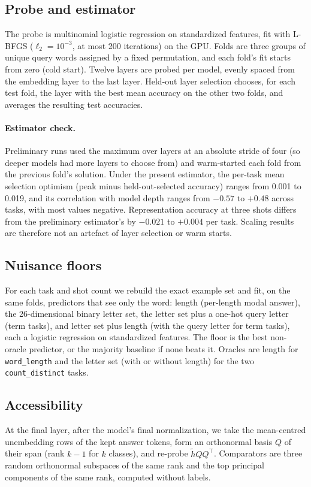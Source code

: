 \subsection{Probe and estimator}
\label{app:estimator}
The probe is multinomial logistic regression on standardized features, fit with L-BFGS
($\ell_2 = 10^{-3}$, at most 200 iterations) on the GPU. Folds are three groups of unique query words
assigned by a fixed permutation, and each fold's fit starts from zero (cold start). Twelve layers are
probed per model, evenly spaced from the embedding layer to the last layer. Held-out layer selection
chooses, for each test fold, the layer with the best mean accuracy on the other two folds, and
averages the resulting test accuracies.

\paragraph{Estimator check.}
Preliminary runs used the maximum over layers at an absolute stride of four (so deeper models had
more layers to choose from) and warm-started each fold from the previous fold's solution. Under the
present estimator, the per-task mean selection optimism (peak minus held-out-selected accuracy)
ranges from 0.001 to 0.019, and its correlation with model depth ranges from $-0.57$ to $+0.48$
across tasks, with most values negative. Representation accuracy at three shots differs from the
preliminary estimator's by $-0.021$ to $+0.004$ per task. Scaling results are therefore not an
artefact of layer selection or warm starts.

\subsection{Nuisance floors}
\label{app:nuis}
For each task and shot count we rebuild the exact example set and fit, on the same folds, predictors
that see only the word: length (per-length modal answer), the 26-dimensional binary letter set, the
letter set plus a one-hot query letter (term tasks), and letter set plus length (with the query letter
for term tasks), each a logistic regression on standardized features. The floor is the best
non-oracle predictor, or the majority baseline if none beats it. Oracles are length for
\texttt{word\_length} and the letter set (with or without length) for the two
\texttt{count\_distinct} tasks.

\subsection{Accessibility}
\label{app:access}
At the final layer, after the model's final normalization, we take the mean-centred unembedding rows
of the kept answer tokens, form an orthonormal basis $Q$ of their span (rank $k-1$ for $k$ classes),
and re-probe $\tilde h Q Q^\top$. Comparators are three random orthonormal subspaces of the same rank
and the top principal components of the same rank, computed without labels.

